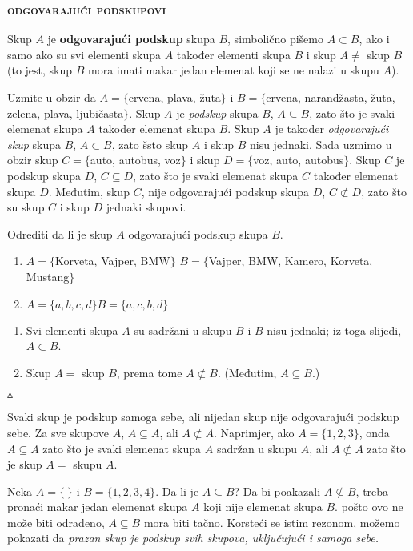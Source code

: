 \documentclass[a4paper,14pt,svgnames]{article}
\newcounter{counter}
\newcommand{\examplecounter}{\textbf{\refstepcounter{counter}PRIMJER \thecounter}}
\newcommand{\example}[3]{\begin{tcolorbox}[title=\large \examplecounter \hfill\small\textbf{"#1"}]
#2
\begin{tcolorbox}[title=\small \textbf{RJEŠENJE},colback=white]
\begin{center}
#3

\vspace{0.5em}\hfill $\vartriangle$
\end{center}
\end{tcolorbox}
\end{tcolorbox}}
\begin{document}
\subsubsection{\textsc{odgovarajući podskupovi}}
\begin{tcolorbox}
Skup $A$ je \textbf{odgovarajući podskup} skupa $B$, simbolično pišemo $A\subset B$, ako i samo ako su svi elementi skupa $A$ također elementi skupa $B$ i skup $A\neq$ skup $B$(to jest, skup $B$ mora imati makar jedan elemenat koji se ne nalazi u skupu $A$).
\end{tcolorbox}

Uzmite u obzir da $A=\{$crvena, plava, žuta$\}$ i $B=\{$crvena, narandžasta, žuta, zelena, plava, ljubičasta$\}$. Skup $A$ je \textit{podskup} skupa $B$, $A\subseteq B$, zato što je svaki elemenat skupa $A$ također elemenat skupa $B$. Skup $A$ je također \textit{odgovarajući skup} skupa $B$, $A\subset B$, zato šsto skup $A$ i skup $B$ nisu jednaki. Sada uzmimo u obzir skup $C=\{$auto, autobus, voz$\}$ i skup $D=\{$voz, auto, autobus$\}$. Skup $C$ je podskup skupa $D$, $C\subseteq D$, zato što je svaki elemenat skupa $C$ također elemenat skupa $D$. Međutim, skup $C$, nije odgovarajući podskup skupa $D$, $C\not\subset D$, zato što su skup $C$ i skup $D$ jednaki skupovi.
\newpage

\example{Da li je skup odgovarajući podskup?}{Odrediti da li je skup $A$ odgovarajući podskup skupa $B$.
\begin{enumerate}[label=\alph*),leftmargin=0.5cm]
\item $A=\{$Korveta, Vajper, BMW$\}$
$B=\{$Vajper, BMW, Kamero, Korveta, Mustang$\}$
\item $A=\{a, b, c, d\}$\quad $B=\{a, c, b, d\}$
\end{enumerate}}{\begin{enumerate}[label=\alph*),leftmargin=0.5cm]
\item Svi elementi skupa $A$ su sadržani u skupu $B$ i $B$ nisu jednaki; iz toga slijedi, $A\subset B$.
\item Skup $A=$ skup $B$, prema tome $A\not\subset B$. (Međutim, $A\subseteq B.$)
\end{enumerate}}

Svaki skup je podskup samoga sebe, ali nijedan skup nije odgovarajući podskup sebe. Za sve skupove $A$, $A\subseteq A$, ali $A\not\subset A$. Naprimjer, ako  $A=\{1, 2, 3\}$, onda $A\subseteq A$ zato što je svaki elemenat skupa $A$ sadržan u skupu $A$, ali $A\not\subset A$ zato što je skup $A=$ skupu $A$.\par
Neka $A = \{\ \}$ i $B=\{1, 2, 3, 4\}$. Da li je $A\subseteq B$? Da bi poakazali $A\nsubseteq B$, treba pronaći makar jedan elemenat skupa $A$ koji nije elemenat skupa $B$. pošto ovo ne može biti odrađeno, $A\subseteq B$ mora biti tačno. Korsteći se istim rezonom, možemo pokazati da \textit{prazan  skup je podskup svih skupova, uključujući i samoga sebe.}
\end{document}

